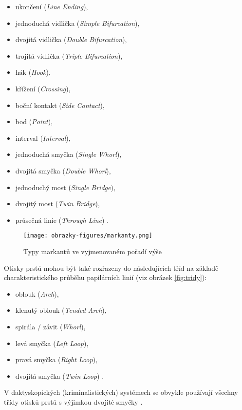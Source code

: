 \begin{itemize}
    \item ukončení (\textit{Line Ending}),
    \item jednoduchá vidlička (\textit{Simple Bifurcation}),
    \item dvojitá vidlička (\textit{Double Bifurcation}),
    \item trojitá vidlička (\textit{Triple Bifurcation}),
    \item hák (\textit{Hook}),
    \item křížení (\textit{Crossing}),
    \item boční kontakt (\textit{Side Contact}),
    \item bod (\textit{Point}),
    \item interval (\textit{Interval}),
    \item jednoduchá smyčka (\textit{Single Whorl}),
    \item dvojitá smyčka (\textit{Double Whorl}),
    \item jednoduchý most (\textit{Single Bridge}),
    \item dvojitý most (\textit{Twin Bridge}),
    \item průsečná linie (\textit{Through Line}) \cite{BIOopora}.\\
\end{itemize}

\begin{figure}[!htbp]
    \centering
    \texttt{[image: obrazky-figures/markanty.png]}
    \caption{Typy markantů ve vyjmenovaném pořadí výše \cite{BIOopora}}
    \label{fig:markanty}
\end{figure}

Otisky prstů mohou být také rozřazeny do následujících tříd na základě charakteristického průběhu papilárních linií (viz obrázek \ref{fig:tridy}):
\begin{itemize}
    \item oblouk (\textit{Arch}),
    \item klenutý oblouk (\textit{Tended Arch}),
    \item spirála / závit (\textit{Whorl}),
    \item levá smyčka (\textit{Left Loop}),
    \item pravá smyčka (\textit{Right Loop}),
    \item dvojitá smyčka (\textit{Twin Loop}) \cite{BIOopora}.
\end{itemize}

V daktyskopických (kriminalistických) systémech se obvykle používají všechny třídy otisků prstů s výjimkou dvojité smyčky \cite{BIOopora}. 

